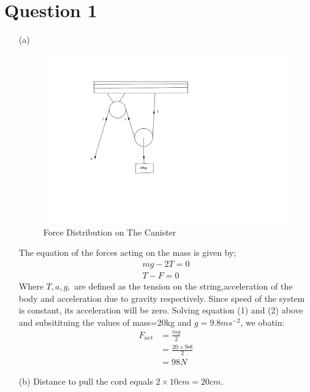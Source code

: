 \documentclass[12pt,a4paper]{article}
\begin{document}
\section*{Question 1}
\begin{itemize}
\item[(a)]
\begin{figure}[h!]
\centering
\includegraphics[scale=0.9]{1.png}
\caption{Force Distribution on The Canister}
\end{figure}

The equation of the forces acting on the mass is given by;
\begin{align}
mg-2T=0\\
T-F=0
\end{align}
Where $T,a,g,$ are defined as the tension on the string,acceleration of the body and acceleration due to gravity respectively. Since speed of the system is constant, its acceleration will be zero. Solving equation (1) and (2) above and subsitituing the values of mass=20kg and $g=9.8ms^{-2}$, we obatin:
\begin{align*}
F_{net}&=\frac{mg}{2}\\
&=\frac{20\times9\centerdot8}{2}\\
&=98N
\end{align*}
\item[(b)]
Distance to pull the cord equals $2\times 10cm = 20cm.$


\end{itemize}
\end{document}
